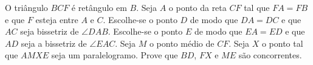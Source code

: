 O triângulo $BCF$ é retângulo em $B$. Seja $A$ o ponto da reta $CF$ tal que $FA=FB$ e que $F$ esteja entre $A$ e $C$. Escolhe-se o ponto $D$ de modo que $DA=DC$ e que $AC$ seja bissetriz de $\angle{DAB}$. Escolhe-se o ponto $E$ de modo que $EA=ED$ e que $AD$ seja a bissetriz de $\angle{EAC}$. Seja $M$ o ponto médio de $CF$. Seja $X$ o ponto tal que $AMXE$ seja um paralelogramo. Prove que $BD$, $FX$ e $ME$ são concorrentes.
